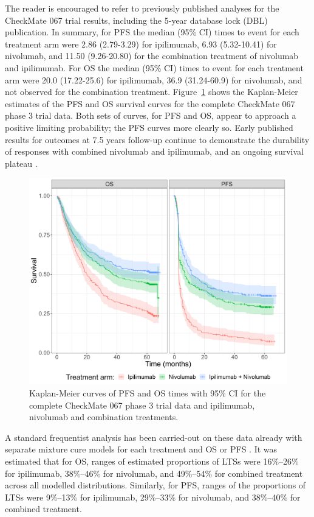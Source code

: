 \documentclass[AMA,STIX1COL]{WileyNJD-v2}
\begin{document}
The reader is encouraged to refer to previously published analyses for the CheckMate 067 trial results, including the 5-year database lock (DBL) publication\cite{Larkin2019}. In summary, for PFS the median (95\% CI) times to event for each treatment arm were 2.86 (2.79-3.29) for ipilimumab, 6.93 (5.32-10.41) for nivolumab, and 11.50 (9.26-20.80) for the combination treatment of nivolumab and ipilimumab. For OS the median (95\% CI) times to event for each treatment arm were 20.0 (17.22-25.6) for ipilimumab, 36.9 (31.24-60.9) for nivolumab, and not observed for the combination treatment.
Figure~\ref{fig:S_raw_data} shows the Kaplan-Meier estimates of the PFS and OS survival curves for the complete CheckMate 067 phase 3 trial data.
Both sets of curves, for PFS and OS, appear to approach a positive limiting probability; the PFS curves more clearly so.
Early published results for outcomes at 7.5 years follow-up continue to demonstrate the durability of responses with combined nivolumab and ipilimumab, and an ongoing survival plateau \cite{Hodi2022}.

\begin{figure}[!ht]
\centering
\includegraphics[width=0.6\linewidth]{km_raw_data.png}
\caption{\label{fig:S_raw_data} Kaplan-Meier curves of PFS and OS times with 95\% CI for the complete CheckMate 067 phase 3 trial data and ipilimumab, nivolumab and combination treatments.}
\end{figure}

A standard frequentist analysis has been carried-out on these data already with separate mixture cure models for each treatment and OS or PFS \cite{Mohr2020}.
It was estimated that for OS, ranges of estimated proportions of LTSs were 16\%–26\% for ipilimumab, 38\%–46\% for nivolumab, and 49\%–54\% for combined treatment across all modelled distributions.
Similarly, for PFS, ranges of the proportions of LTSs were 9\%–13\% for ipilimumab, 29\%–33\% for nivolumab, and 38\%–40\% for combined treatment.
\end{document}
